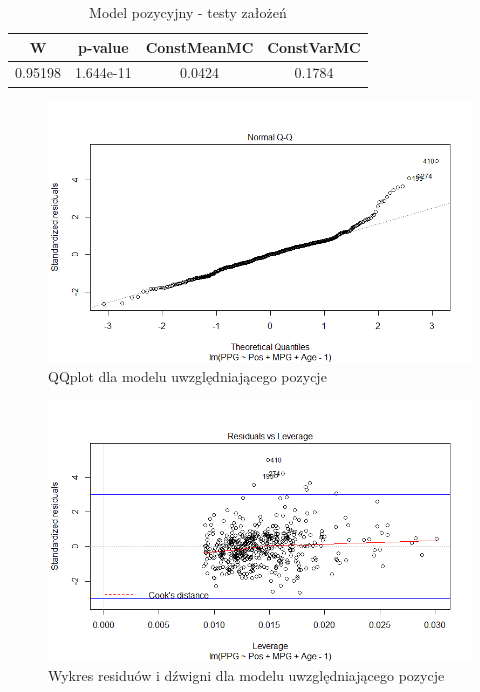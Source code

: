 \documentclass[11pt,a4paper]{article}
\begin{document}
\begin{table}[H]
	\begin{center}
		\begin{tabular}{| c | c | c | c |}
			\hline
			W & p-value & ConstMeanMC & ConstVarMC\\ \hline
			0.95198 & 1.644e-11 & 0.0424 & 0.1784 \\ \hline
		\end{tabular}
		\caption{Model pozycyjny - testy założeń}
		\label{zalozenia_position}
	\end{center}
\end{table}
\begin{figure}[t]
	\includegraphics[width=\textwidth]{position_2}
	\caption{QQplot dla modelu uwzględniającego pozycje}
	\label{qqplot_position}
	\centering
\end{figure}
\begin{figure}[t]
	\includegraphics[width=\textwidth]{position_4}
	\caption{Wykres residuów i dźwigni dla modelu uwzględniającego pozycje}
	\label{leverage_position}
	\centering
\end{figure}
\end{document}

